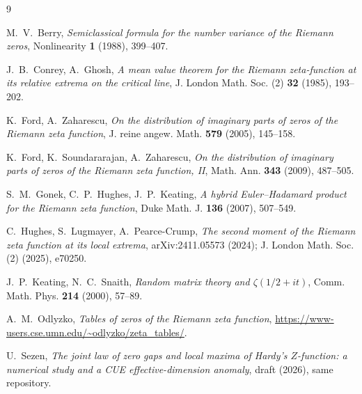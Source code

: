 \documentclass[12pt]{amsart}
\begin{document}
\begin{thebibliography}{9}

 M.~V.~Berry, \emph{Semiclassical formula for the number
variance of the Riemann zeros}, Nonlinearity \textbf{1} (1988), 399--407.

 J.~B.~Conrey, A.~Ghosh, \emph{A mean value theorem for the
Riemann zeta-function at its relative extrema on the critical line},
J. London Math. Soc. (2) \textbf{32} (1985), 193--202.

 K.~Ford, A.~Zaharescu, \emph{On the distribution of
imaginary parts of zeros of the Riemann zeta function}, J. reine angew.
Math. \textbf{579} (2005), 145--158.

 K.~Ford, K.~Soundararajan, A.~Zaharescu, \emph{On the
distribution of imaginary parts of zeros of the Riemann zeta function,
II}, Math. Ann. \textbf{343} (2009), 487--505.

 S.~M.~Gonek, C.~P.~Hughes, J.~P.~Keating, \emph{A hybrid
Euler--Hadamard product for the Riemann zeta function}, Duke Math. J.
\textbf{136} (2007), 507--549.

 C.~Hughes, S.~Lugmayer, A.~Pearce-Crump, \emph{The second
moment of the Riemann zeta function at its local extrema},
arXiv:2411.05573 (2024); J. London Math. Soc. (2) (2025), e70250.

 J.~P.~Keating, N.~C.~Snaith, \emph{Random matrix theory and
$\zeta(1/2+it)$}, Comm. Math. Phys. \textbf{214} (2000), 57--89.

 A.~M.~Odlyzko, \emph{Tables of zeros of the
Riemann zeta function},
\url{https://www-users.cse.umn.edu/~odlyzko/zeta_tables/}.

 U.~Sezen, \emph{The joint law of zero gaps and local
maxima of Hardy's $Z$-function: a numerical study and a CUE
effective-dimension anomaly}, draft (2026), same repository.

\end{thebibliography}
\end{document}
